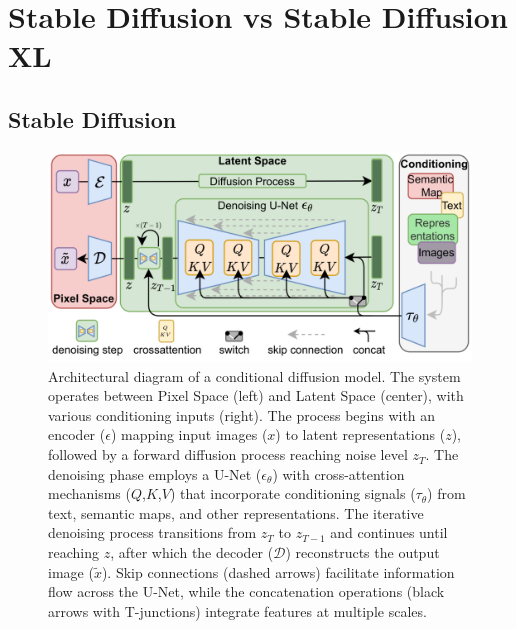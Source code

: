 \chapter{\normalsize Stable Diffusion vs Stable Diffusion XL}
\section*{Stable Diffusion}


\begin{figure}[H]
    \centering
    \includegraphics[width=1\linewidth]{article-Figure3-1-1536x762.png}
    \caption{Architectural diagram of a conditional diffusion model. The system operates between Pixel Space (left) and Latent Space (center), with various conditioning inputs (right). The process begins with an encoder ($\epsilon$) mapping input images ($x$) to latent representations ($z$), followed by a forward diffusion process reaching noise level $z_T$. The denoising phase employs a U-Net ($\epsilon_\theta$) with cross-attention mechanisms ($Q$,$K$,$V$) that incorporate conditioning signals ($\tau_\theta$) from text, semantic maps, and other representations. The iterative denoising process transitions from $z_T$ to $z_{T-1}$ and continues until reaching $z$, after which the decoder ($\mathcal{D}$) reconstructs the output image ($\tilde{x}$). Skip connections (dashed arrows) facilitate information flow across the U-Net, while the concatenation operations (black arrows with T-junctions) integrate features at multiple scales.}
    \label{fig:diffusion_architecture}
\end{figure}

